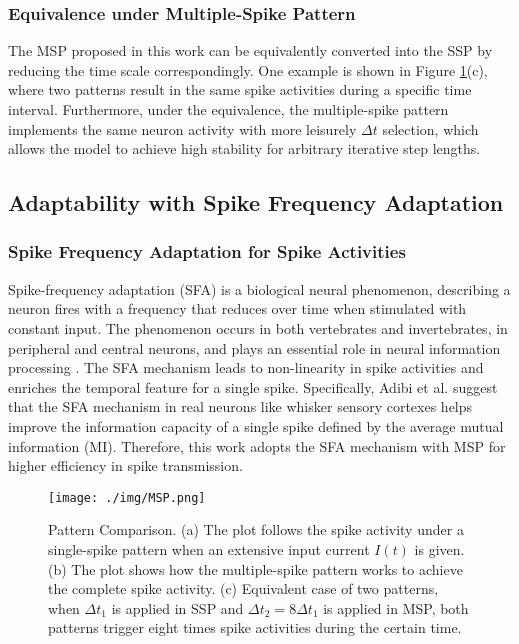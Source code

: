 \documentclass{article}
\begin{document}
\subsubsection{Equivalence under Multiple-Spike Pattern}
The MSP proposed in this work can be equivalently converted into the SSP by reducing the time scale correspondingly. One example is shown in Figure \ref{fig:Pattern Comparison}(c), where two patterns result in the same spike activities during a specific time interval. Furthermore, under the equivalence, the multiple-spike pattern implements the same neuron activity with more leisurely $\Delta t$ selection, which allows the model to achieve high stability for arbitrary iterative step lengths. 





\subsection{Adaptability with Spike Frequency Adaptation}

\subsubsection{Spike Frequency Adaptation for Spike Activities}



Spike-frequency adaptation (SFA) is a biological neural phenomenon, describing a neuron fires with a frequency that reduces over time when stimulated with constant input.
The phenomenon occurs in both vertebrates and invertebrates, in peripheral and central neurons, and plays an essential role in neural information processing \cite{benda_universal_2003}. The SFA mechanism leads to non-linearity in spike activities and enriches the temporal feature for a single spike. 
Specifically, Adibi et al.  suggest that the SFA mechanism in real neurons like whisker sensory cortexes helps improve the information capacity of a single spike defined by the average mutual information (MI).
Therefore, this work adopts the SFA mechanism with MSP for higher efficiency in spike transmission.

\begin{figure}[htbp]
    \centering
    \texttt{[image: ./img/MSP.png]}
    \caption{Pattern Comparison. (a) The plot follows the spike activity under a single-spike pattern when an extensive input current $I(t)$ is given. (b) The plot shows how the multiple-spike pattern works to achieve the complete spike activity. (c) Equivalent case of two patterns, when $\Delta t_1$ is applied in SSP and $\Delta t_2=8\Delta t_1$ is applied in MSP, both patterns trigger eight times spike activities during the certain time.}
    \label{fig:Pattern Comparison}
\end{figure}
\end{document}
